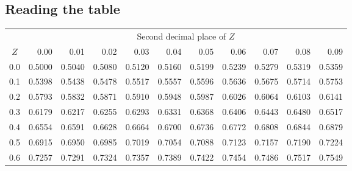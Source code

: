 \documentclass[11pt]{article}
\begin{document}
\subsection{Reading the table}
\begin{table}[h]
\vspace{-19.7pt}
\begin{center}
\begin{tabular}{c | rrrrr | rrrrr |}
  \cline{2-11}
&&&& \multicolumn{4}{c}{Second decimal place of $Z$} &&& \\
  \cline{2-11}
$Z$ & 0.00 & 0.01 & 0.02 & 0.03 & 0.04 & 0.05 & 0.06 & 0.07 & 0.08 & 0.09 \\
  \hline
  \hline
0.0 & \scriptsize{0.5000} & \scriptsize{0.5040} & \scriptsize{0.5080} & \scriptsize{0.5120} & \scriptsize{0.5160} & \scriptsize{0.5199} & \scriptsize{0.5239} & \scriptsize{0.5279} & \scriptsize{0.5319} & \scriptsize{0.5359} \\
  0.1 & \scriptsize{0.5398} & \scriptsize{0.5438} & \scriptsize{0.5478} & \scriptsize{0.5517} & \scriptsize{0.5557} & \scriptsize{0.5596} & \scriptsize{0.5636} & \scriptsize{0.5675} & \scriptsize{0.5714} & \scriptsize{0.5753} \\
  0.2 & \scriptsize{0.5793} & \scriptsize{0.5832} & \scriptsize{0.5871} & \scriptsize{0.5910} & \scriptsize{0.5948} & \scriptsize{0.5987} & \scriptsize{0.6026} & \scriptsize{0.6064} & \scriptsize{0.6103} & \scriptsize{0.6141} \\
  0.3 & \scriptsize{0.6179} & \scriptsize{0.6217} & \scriptsize{0.6255} & \scriptsize{0.6293} & \scriptsize{0.6331} & \scriptsize{0.6368} & \scriptsize{0.6406} & \scriptsize{0.6443} & \scriptsize{0.6480} & \scriptsize{0.6517} \\
  0.4 & \scriptsize{0.6554} & \scriptsize{0.6591} & \scriptsize{0.6628} & \scriptsize{0.6664} & \scriptsize{0.6700} & \scriptsize{0.6736} & \scriptsize{0.6772} & \scriptsize{0.6808} & \scriptsize{0.6844} & \scriptsize{0.6879} \\
  \hline
  0.5 & \scriptsize{0.6915} & \scriptsize{0.6950} & \scriptsize{0.6985} & \scriptsize{0.7019} & \scriptsize{0.7054} & \scriptsize{0.7088} & \scriptsize{0.7123} & \scriptsize{0.7157} & \scriptsize{0.7190} & \scriptsize{0.7224} \\
  0.6 & \scriptsize{0.7257} & \scriptsize{0.7291} & \scriptsize{0.7324} & \scriptsize{0.7357} & \scriptsize{0.7389} & \scriptsize{0.7422} & \scriptsize{0.7454} & \scriptsize{0.7486} & \scriptsize{0.7517} & \scriptsize{0.7549} \\

\end{tabular}
\end{center}
\end{table}
\end{document}
